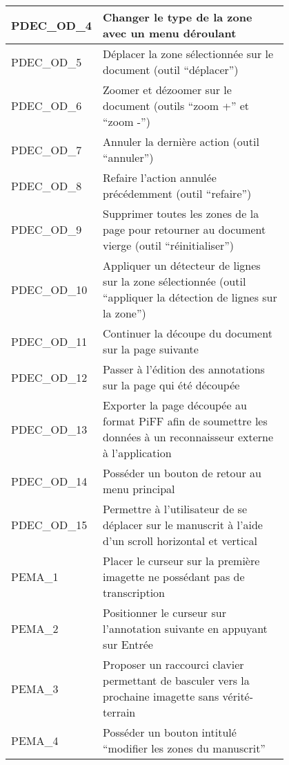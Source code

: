 \begin{center}
\begin{tabular}{ | l | p{0.8\linewidth} | }
        \hline
        \rowcolor{red!30}PDEC\_OD\_4 & Changer le type de la zone avec un menu déroulant \\
        \hline
        \rowcolor{red!30}PDEC\_OD\_5 & Déplacer la zone sélectionnée sur le document (outil “déplacer”) \\
        \hline
        \rowcolor{red!30}PDEC\_OD\_6 & Zoomer et dézoomer sur le document (outils “zoom +” et “zoom -”) \\
        \hline
        \rowcolor{red!30}PDEC\_OD\_7 & Annuler la dernière action (outil “annuler”) \\
        \hline
        \rowcolor{red!30}PDEC\_OD\_8 & Refaire l’action annulée précédemment (outil “refaire”) \\
        \hline
        \rowcolor{red!30}PDEC\_OD\_9 & Supprimer toutes les zones de la page pour retourner au document vierge (outil “réinitialiser”) \\
        \hline
        \rowcolor{red!30}PDEC\_OD\_10 & Appliquer un détecteur de lignes sur la zone sélectionnée (outil “appliquer la détection de lignes sur la zone”) \\
        \hline
        \rowcolor{red!30}PDEC\_OD\_11 & Continuer la découpe du document sur la page suivante \\
        \hline
        \rowcolor{red!30}PDEC\_OD\_12 & Passer à l’édition des annotations sur la page qui été découpée \\
        \hline
        \rowcolor{red!30}PDEC\_OD\_13 & Exporter la page découpée au format PiFF afin de soumettre les données à un reconnaisseur externe à l’application \\
        \hline
        \rowcolor{red!30}PDEC\_OD\_14 & Posséder un bouton de retour au menu principal \\
        \hline
        \rowcolor{red!30}PDEC\_OD\_15 & Permettre à l’utilisateur de se déplacer sur le manuscrit à l’aide d’un scroll horizontal et vertical \\
        \hline
        PEMA\_1 & Placer le curseur sur la première imagette ne possédant pas de transcription \\
        \hline
        PEMA\_2 & Positionner le curseur sur l’annotation suivante en appuyant sur Entrée \\
        \hline
        PEMA\_3 & Proposer un raccourci clavier permettant de basculer vers la prochaine imagette sans vérité-terrain \\
        \hline
        \rowcolor{red!30}PEMA\_4 & Posséder un bouton intitulé “modifier les zones du manuscrit” \\

\end{tabular}
\end{center}
